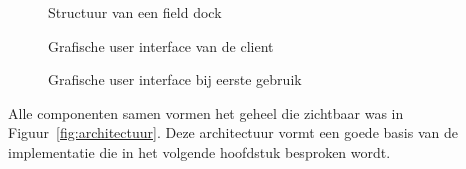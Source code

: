 \begin{figure}[!ht]
\centering
{}
\caption{Structuur van een field dock}
\label{fig:fieldDock}

\caption{Grafische user interface van de client}
\label{fig:overviewClient}

\caption{Grafische user interface bij eerste gebruik}
\label{fig:startClient}

\end{figure}

Alle componenten samen vormen het geheel die zichtbaar was in Figuur~\vref{fig:architectuur}.
Deze architectuur vormt een goede basis van de implementatie die in het volgende hoofdstuk besproken wordt.

